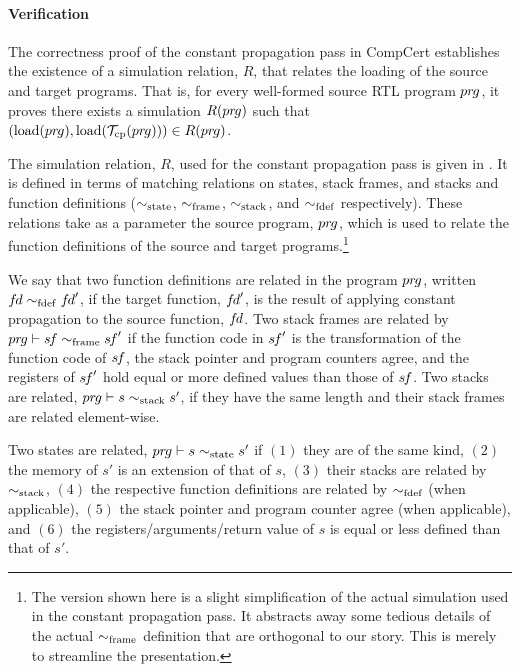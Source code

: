 



\paragraph{Verification}

The correctness proof of the constant propagation pass in CompCert establishes 
the existence of a simulation relation, $R$, that relates the loading of the source and target programs.
That is, for every well-formed source RTL program ${pr\hspace*{-1pt}g}$, it proves 
there exists a simulation $R({pr\hspace*{-1pt}g})$ such that 
$(\mathrm{load}({pr\hspace*{-1pt}g}),\mathrm{load}(\mathcal{T}_\mathrm{cp}({pr\hspace*{-1pt}g})))\in R({pr\hspace*{-1pt}g})$.

The simulation relation, $R$, used for the constant propagation pass is given in
.  It is defined in terms of matching relations on states, stack frames,
and stacks and function definitions ($\sim_{\mathrm{state}}$, $\sim_{\mathrm{frame}}$, $\sim_{\mathrm{stack}}$, and $\sim_{\mathrm{fdef}}$
respectively).  These relations take as a parameter the source program, ${pr\hspace*{-1pt}g}$, which is used to
relate the function definitions of the source and target programs.\footnote{The version shown here
  is a slight simplification of the actual simulation used in the constant propagation pass.  It
  abstracts away some tedious details of the actual $\sim_{\mathrm{frame}}$ definition that are orthogonal to
  our story.  This is merely to streamline the presentation.}

We say that two function definitions are related in the program ${pr\hspace*{-1pt}g}$, written ${f\hspace*{-1pt}d} \sim_{\mathrm{fdef}} {f\hspace*{-1pt}d}'$, 
if the target function, ${f\hspace*{-1pt}d}'$, is the result of applying constant propagation to the source function, ${f\hspace*{-1pt}d}$.
Two stack frames are related by ${pr\hspace*{-1pt}g} \vdash {s\hspace*{-1pt}f}\sim_{\mathrm{frame}} {s\hspace*{-1pt}f}'$ if 
the function code in ${s\hspace*{-1pt}f}'$ is the transformation of the function code of ${s\hspace*{-1pt}f}$,
the stack pointer and program counters agree, and
the registers of ${s\hspace*{-1pt}f}'$ hold equal or more defined values than those of ${s\hspace*{-1pt}f}$.
Two stacks are related, ${pr\hspace*{-1pt}g} \vdash s\sim_{\mathrm{stack}} s'$, if they have the same length and their stack frames are related element-wise.



Two states are related, ${pr\hspace*{-1pt}g} \vdash s \sim_{\mathrm{state}} s'$
if $(1)$ they are of the same kind, 
$(2)$ the memory of $s'$ is an extension of that of $s$, 
$(3)$ their stacks are related by $\sim_{\mathrm{stack}}$,
$(4)$ the respective function definitions are related by $\sim_{\mathrm{fdef}}$ (when applicable),
$(5)$ the stack pointer and program counter agree (when applicable), and
$(6)$ the registers/arguments/return value of $s$ is equal or less defined than that of $s'$. 

